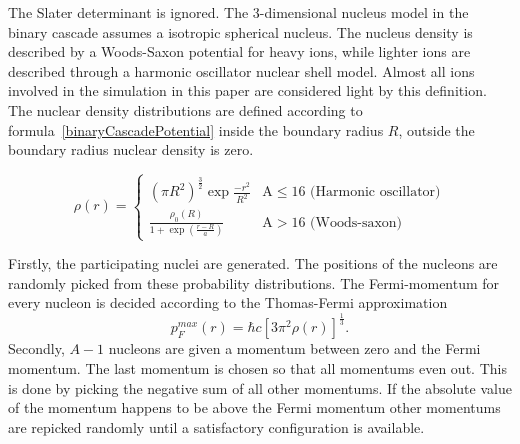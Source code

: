The Slater determinant is ignored. The 3-dimensional nucleus model in the binary cascade assumes a isotropic spherical nucleus. The nucleus density is described by a Woods-Saxon potential for heavy ions, while lighter ions are described through a harmonic oscillator nuclear shell model. Almost all ions involved in the simulation in this paper are considered light by this definition. The nuclear density distributions are defined according to formula~\ref{binaryCascadePotential} inside the boundary radius $R$, outside the boundary radius nuclear density is zero.

\begin{equation}
\rho(r) = 
\begin{cases}
(\pi R^2)^{\frac{3}{2}}\exp{\frac{-r^2}{R^2}} & \text{A} \le 16 \text{  (Harmonic oscillator)}\\
\frac{\rho_{0}(R)}{1+\exp({\frac{r-R}{a}})} & \text{A} > 16 \text{  (Woods-saxon)}
\end{cases}
\label{binaryCascadePotential}
\end{equation}

Firstly, the participating nuclei are generated. The positions of the nucleons are randomly picked from these probability distributions. The Fermi-momentum for every nucleon is decided according to the Thomas-Fermi approximation \begin{equation}p^{max}_F(r) = \hbar c [3 \pi^2 \rho(r)]^\frac{1}{3}.\end{equation}Secondly, $A-1$ nucleons are given a momentum between zero and the Fermi momentum. The last momentum is chosen so that all momentums even out. This is done by picking the negative sum of all other momentums. If the absolute value of the momentum happens to be above the Fermi momentum other momentums are repicked randomly until a satisfactory configuration is available.

